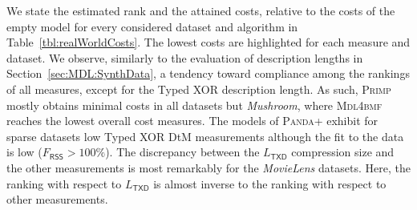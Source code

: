We state the estimated rank and the attained costs, relative to the costs of the empty model for every considered dataset and algorithm in Table~\ref{tbl:realWorldCosts}. The lowest costs are highlighted for each measure and dataset. We observe, similarly to the evaluation of description lengths in Section~\ref{sec:MDL:SynthData}, a tendency toward compliance among the rankings of all measures, except for the Typed XOR description length. 
As such, \textsc{Primp} mostly obtains minimal costs in all datasets but \textit{Mushroom}, where \textsc{Mdl4bmf} reaches the lowest overall cost measures. The models of \textsc{Panda+} exhibit for sparse datasets low Typed XOR DtM measurements although the fit to the data is low ($F_\mathsf{RSS}>100\%$). The discrepancy between the $L_\mathsf{TXD}$ compression size and the other measurements is most remarkably for the \textit{MovieLens} datasets. Here, the ranking with respect to $L_\mathsf{TXD}$ is  almost inverse to the ranking with respect to other measurements.
